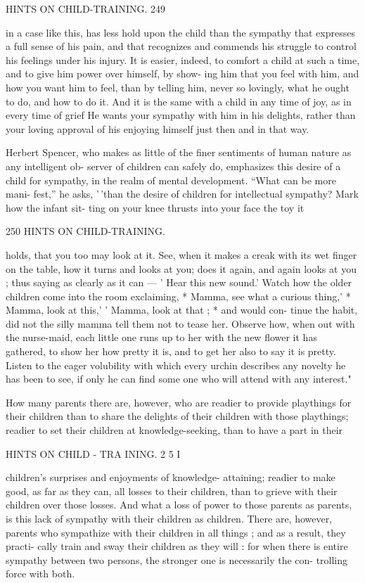 \documentclass[
]{book}
\begin{document}
HINTS ON CHILD-TRAINING. 249

in a case like this, has less hold upon the child than the sympathy that expresses a full sense of his pain, and that recognizes and commends his struggle to control his feelings under his injury. It is easier, indeed, to comfort a child at such a time, and to give him power over himself, by show- ing him that you feel with him, and how you want him to feel, than by telling him, never so lovingly, what he ought to do, and how to do it. And it is the same with a child in any time of joy, as in every time of grief He wants your sympathy with him in his delights, rather than your loving approval of his enjoying himself just then and in that way.

Herbert Spencer, who makes as little of the finer sentiments of human nature as any intelligent ob- server of children can safely do, emphasizes this desire of a child for sympathy, in the realm of mental development. ``What can be more mani- fest,'' he asks, '\,'than the desire of children for intellectual sympathy? Mark how the infant sit- ting on your knee thrusts into your face the toy it

250 HINTS ON CHILD-TRAINING.

holds, that you too may look at it. See, when it makes a creak with its wet finger on the table, how it turns and looks at you; does it again, and again looks at you ; thus saying as clearly as it can --- ' Hear this new sound.' Watch how the older children come into the room exclaiming, * Mamma, see what a curious thing,' * Mamma, look at this,' ' Mamma, look at that ; * and would con- tinue the habit, did not the silly mamma tell them not to tease her. Observe how, when out with the nurse-maid, each little one runs up to her with the new flower it has gathered, to show her how pretty it is, and to get her also to say it is pretty. Listen to the eager volubility with which every urchin describes any novelty he has been to see, if only he can find some one who will attend with any interest."

How many parents there are, however, who are readier to provide playthings for their children than to share the delights of their children with those playthings; readier to set their children at knowledge-seeking, than to have a part in their

HINTS ON CHILD - TRA INING. 2 5 I

children's surprises and enjoyments of knowledge- attaining; readier to make good, as far as they can, all losses to their children, than to grieve with their children over those losses. And what a loss of power to those parents as parents, is this lack of sympathy with their children as children. There are, however, parents who sympathize with their children in all things ; and as a result, they practi- cally train and sway their children as they will : for when there is entire sympathy between two persons, the stronger one is necessarily the con- trolling force with both.
\end{document}
